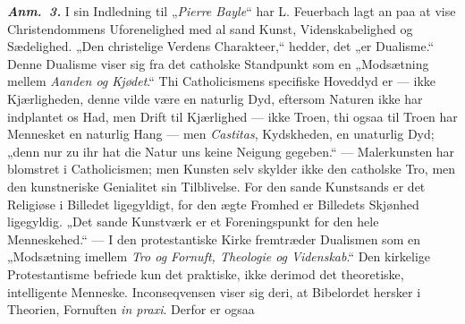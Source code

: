\documentclass[12pt]{book}
\newcommand{\anm}[1]{\emph{\textbf{Anm.~#1.}}}
\newcommand{\opage}[1]{\marginnote{\footnotesize\textit{[#1]}}}
\begin{document}
\opage{263} %
\anm{3} I sin Indledning til „\textit{Pierre Bayle}“ har L. Feuerbach lagt an paa at vise
Christendommens Uforenelighed med al sand Kunst, Videnskabelighed og Sædelighed. „Den
christelige Verdens Charakteer,“ hedder, det „er Dualisme.“ Denne Dualisme viser sig fra
det catholske Standpunkt som en „Modsætning mellem \emph{Aanden og Kjødet}.“ Thi
Catholicismens specifiske Hoveddyd er --- ikke Kjærligheden, denne vilde være en naturlig
Dyd, eftersom Naturen ikke har indplantet os Had, men Drift til Kjærlighed --- ikke Troen,
thi ogsaa til Troen har Mennesket en naturlig Hang --- men \textit{Castitas}, Kydskheden,
en unaturlig Dyd; „denn nur zu ihr hat die Natur uns keine Neigung gegeben.“ ---
Malerkunsten har blomstret i Catholicismen; men Kunsten selv skylder ikke den catholske
Tro, men den kunstneriske Genialitet sin Tilblivelse. For den sande Kunstsands er det
Religiøse i Billedet ligegyldigt, for den ægte Fromhed er Billedets Skjønhed ligegyldig.
„Det sande Kunstværk er et Foreningspunkt for den hele Menneskehed.“ --- I den
protestantiske Kirke fremtræder Dualismen som en „Modsætning imellem \emph{Tro og
Fornuft, Theologie og Videnskab}.“ Den kirkelige Protestantisme befriede kun det
praktiske, ikke derimod det theoretiske, intelligente Menneske. Inconseqvensen viser sig
deri, at Bibelordet hersker i Theorien, Fornuften \textit{in praxi}. Derfor er ogsaa
\end{document}
